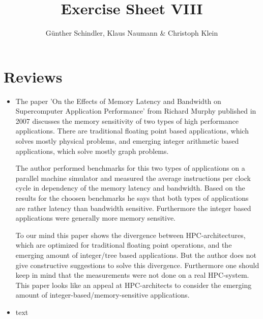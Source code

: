 \documentclass[oneside, a4paper, DIV=10]{scrartcl}
\title{Exercise Sheet VIII}
\author{G\"unther Schindler, Klaus Naumann \& Christoph Klein}
\begin{document}
\maketitle

\section*{Reviews}
\begin{itemize}
    \item
    The paper 'On the Effects of Memory Latency and Bandwidth on
    Supercomputer Application Performance' from Richard Murphy
    published in 2007 discusses the memory sensitivity of two types
    of high performance applications. There are traditional floating
    point based applications, which solves mostly physical problems,
    and emerging integer arithmetic based applications, which solve mostly
    graph problems.

    The author performed benchmarks for this two types of applications
    on a parallel machine simulator and measured the average instructions
    per clock cycle in dependency of the memory latency and bandwidth. Based
    on the results for the choosen benchmarks he says that both types of
    applications are rather latency than bandwidth sensitive. Furthermore
    the integer based applications were generally more memory 
    sensitive.

    To our mind this paper shows the divergence between HPC-architectures,
    which are optimized for traditional floating point operations, and the
    emerging amount of integer/tree based applications. But the author
    does not give constructive suggestions to solve this divergence. Furthermore
    one should keep in mind that the measurements were not done on a real HPC-system.
    This paper looks like an appeal at HPC-architects to consider the emerging
    amount of integer-based/memory-sensitive applications.

    \item text
\end{itemize}    

    
\end{document}
